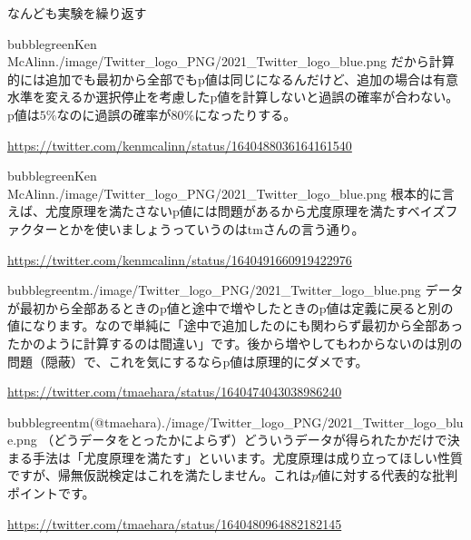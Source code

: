 \begin{SMbox}{なんども実験を繰り返す}
\begin{rightbubbles}{bubblegreen}{Ken McAlinn}{./image/Twitter_logo_PNG/2021_Twitter_logo_blue.png}
  だから計算的には追加でも最初から全部でもp値は同じになるんだけど、追加の場合は有意水準を変えるか選択停止を考慮したp値を計算しないと過誤の確率が合わない。p値は$5\%$なのに過誤の確率が$80\%$になったりする。
\begin{flushright} 
\small	\url{https://twitter.com/kenmcalinn/status/1640488036164161540}
\end{flushright}    
\end{rightbubbles}

\begin{rightbubbles}{bubblegreen}{Ken McAlinn}{./image/Twitter_logo_PNG/2021_Twitter_logo_blue.png}
  根本的に言えば、尤度原理を満たさないp値には問題があるから尤度原理を満たすベイズファクターとかを使いましょうっていうのはtmさんの言う通り。
\begin{flushright} 
\small	\url{https://twitter.com/kenmcalinn/status/1640491660919422976}
\end{flushright}    
\end{rightbubbles}

\begin{rightbubbles}{bubblegreen}{tm}{./image/Twitter_logo_PNG/2021_Twitter_logo_blue.png}
  データが最初から全部あるときのp値と途中で増やしたときのp値は定義に戻ると別の値になります。なので単純に「途中で追加したのにも関わらず最初から全部あったかのように計算するのは間違い」です。後から増やしてもわからないのは別の問題（隠蔽）で、これを気にするならp値は原理的にダメです。
\begin{flushright} 
\small	\url{https://twitter.com/tmaehara/status/1640474043038986240}
\end{flushright}    
\end{rightbubbles}


\begin{rightbubbles}{bubblegreen}{tm(@tmaehara)}{./image/Twitter_logo_PNG/2021_Twitter_logo_blue.png}
  （どうデータをとったかによらず）どういうデータが得られたかだけで決まる手法は「尤度原理を満たす」といいます。尤度原理は成り立ってほしい性質ですが、帰無仮説検定はこれを満たしません。これは$p$値に対する代表的な批判ポイントです。
\begin{flushright} 
\small	\url{https://twitter.com/tmaehara/status/1640480964882182145}
\end{flushright}    
\end{rightbubbles}


\end{SMbox}

